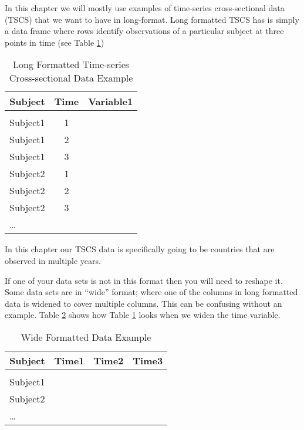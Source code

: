 \noindent In this chapter we will mostly use examples of time-series cross-sectional data (TSCS) that we want to have in long-format. Long formatted TSCS has is simply a data frame where rows identify observations of a particular subject at three points in time (see Table \ref{ExampleTSCSLong})

 \begin{table}[h!]
    \caption{Long Formatted Time-series Cross-sectional Data Example}
    \label{ExampleTSCSLong}
    \begin{tabular}{l c c}
        \\[0.15cm]
        \hline
        Subject & Time & Variable1 \\
        \hline \\[0.1cm]
        Subject1 & 1 & \\[0.25cm]
        Subject1 & 2 & \\[0.25cm]
        Subject1 & 3 & \\[0.25cm]
        Subject2 & 1 & \\[0.25cm]
        Subject2 & 2 & \\[0.25cm]
        Subject2 & 3 & \\[0.25cm]
        \ldots & & \\[0.25cm]
        \hline
    \end{tabular}
\end{table}

\noindent In this chapter our TSCS data is specifically going to be countries that are observed in multiple years.

\noindent If one of your data sets is not in this format then you will need to reshape it. Some data sets are in ``wide'' format; where one of the columns in long formatted data is widened to cover multiple columns. This can be confusing without an example. Table \ref{ExampleWide} shows how Table \ref{ExampleTSCSLong} looks when we widen the time variable.

\begin{table}[h!]
    \caption{Wide Formatted Data Example}
    \label{ExampleWide}
    \begin{tabular}{l c c c}
        \\[0.15cm]
        \hline 
        Subject & Time1 & Time2 & Time3 \\
        \hline \\[0.1cm]
        Subject1 & & & \\[0.25cm]
        Subject2 & & & \\[0.25cm]
        \ldots & & & \\[0.25cm]
        \hline
    \end{tabular}
\end{table}

